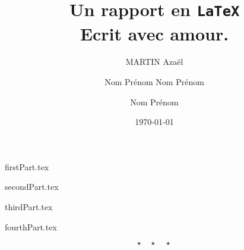 \documentclass{rUTT}
\title{
    Un rapport en \texttt{LaTeX} \\
    Ecrit avec amour.
    }
\date{\today}
\author{
    {\sc MARTIN} Azaël
    \and 
    {\sc Nom} Prénom
    \break
    {\sc Nom} Prénom
    \and
    {\sc Nom} Prénom
    \break
    }
\begin{document}
    \frontpage
    \tableofcontents %

    \clearpage

    \justifying

    {firstPart.tex}

    \clearpage

    {secondPart.tex}

    \clearpage

    {thirdPart.tex}

    \clearpage

    {fourthPart.tex}

    \medskip %

    \[ \star \quad \star \quad \star \]

    \nocite{*} %

    {
    \RaggedRight %
    \sloppy
    \printbibliography[title={Bibliographie}]
    }
\end{document}
